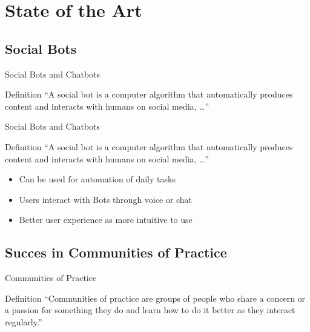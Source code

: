 
\section{State of the Art}

\subsection{Social Bots}
\begin{frame}{Social Bots and Chatbots}
  \begin{block}{Definition}
    ``A social bot is a computer algorithm that automatically produces content and interacts with humans on social media, \dots'' \cite{FVD*16b}
  \end{block}
\end{frame}
\begin{frame}{Social Bots and Chatbots}
  \begin{block}{Definition}
    ``A social bot is a computer algorithm that automatically produces content and interacts with humans on social media, \dots'' \cite{FVD*16b}
  \end{block}
  \begin{itemize}
    \item Can be used for automation of daily tasks %
    \item Users interact with Bots through voice or chat %
    \item Better user experience as more intuitive to use
  \end{itemize}
\end{frame}

\subsection{Succes in Communities of Practice}
\begin{frame}{Communities of Practice}
  \begin{block}{Definition}
    ``Communities of practice are groups of people who share a concern or a
    passion for something they do and learn how to do it better as they interact regularly.'' \cite{Weng98}
  \end{block}
\end{frame}

